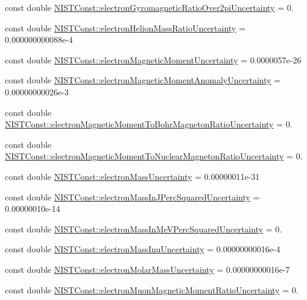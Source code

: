 \begin{DoxyCompactItemize}
\item 
const double \hyperlink{group___n_i_s_t_const-_electron_ga12a5f7854d899e2c2d637708d0c1b4ec}{N\+I\+S\+T\+Const\+::electron\+Gyromagnetic\+Ratio\+Over2pi\+Uncertainty} = 0.
\item 
const double \hyperlink{group___n_i_s_t_const-_electron_ga38d8d37bdbda6d2c1ad4165f56901cdc}{N\+I\+S\+T\+Const\+::electron\+Helion\+Mass\+Ratio\+Uncertainty} = 0.\+000000000088e-\/4
\item 
const double \hyperlink{group___n_i_s_t_const-_electron_ga0708e99452bf307ef0514f373323f12d}{N\+I\+S\+T\+Const\+::electron\+Magnetic\+Moment\+Uncertainty} = 0.\+0000057e-\/26
\item 
const double \hyperlink{group___n_i_s_t_const-_electron_gaa969c8b38343f0906e12da4cb803ad68}{N\+I\+S\+T\+Const\+::electron\+Magnetic\+Moment\+Anomaly\+Uncertainty} = 0.\+00000000026e-\/3
\item 
const double \hyperlink{group___n_i_s_t_const-_electron_ga330a6a13f184692a63aeb4d32e4f078b}{N\+I\+S\+T\+Const\+::electron\+Magnetic\+Moment\+To\+Bohr\+Magneton\+Ratio\+Uncertainty} = 0.
\item 
const double \hyperlink{group___n_i_s_t_const-_electron_gaef21c4a5c3acb2839194d7ad221ab91c}{N\+I\+S\+T\+Const\+::electron\+Magnetic\+Moment\+To\+Nuclear\+Magneton\+Ratio\+Uncertainty} = 0.
\item 
const double \hyperlink{group___n_i_s_t_const-_electron_ga558edc70a085ccbed99ad3e485b8abda}{N\+I\+S\+T\+Const\+::electron\+Mass\+Uncertainty} = 0.\+00000011e-\/31
\item 
const double \hyperlink{group___n_i_s_t_const-_electron_ga618a0b2f35db66864a956a941c6491de}{N\+I\+S\+T\+Const\+::electron\+Mass\+In\+J\+Perc\+Squared\+Uncertainty} = 0.\+00000010e-\/14
\item 
const double \hyperlink{group___n_i_s_t_const-_electron_ga9c3afb804f3846bec7340c098aed401e}{N\+I\+S\+T\+Const\+::electron\+Mass\+In\+Me\+V\+Perc\+Squared\+Uncertainty} = 0.
\item 
const double \hyperlink{group___n_i_s_t_const-_electron_ga8f8888c07573f5b4f8c1ebb553383592}{N\+I\+S\+T\+Const\+::electron\+Mass\+Inu\+Uncertainty} = 0.\+00000000016e-\/4
\item 
const double \hyperlink{group___n_i_s_t_const-_electron_gadea683a9751b639f6d3375df24458b23}{N\+I\+S\+T\+Const\+::electron\+Molar\+Mass\+Uncertainty} = 0.\+00000000016e-\/7
\item 
const double \hyperlink{group___n_i_s_t_const-_electron_ga57b643cd9b1f9dd4199592ca13a2f2eb}{N\+I\+S\+T\+Const\+::electron\+Muon\+Magnetic\+Moment\+Ratio\+Uncertainty} = 0.

\end{DoxyCompactItemize}
